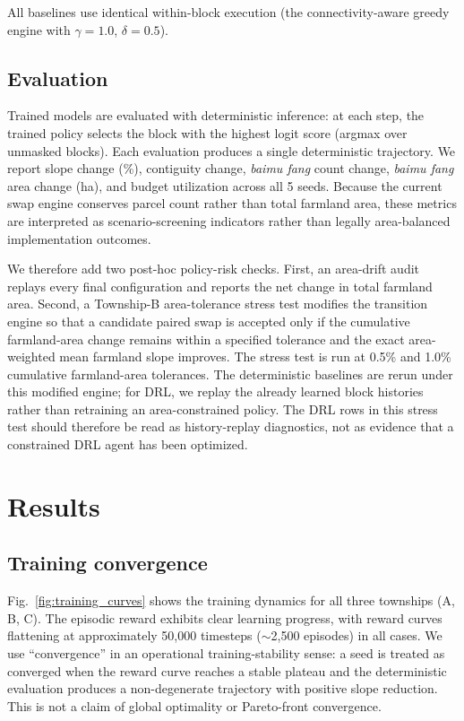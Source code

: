 \documentclass[preprint,12pt]{elsarticle}
\begin{document}
All baselines use identical within-block execution (the connectivity-aware greedy engine with $\gamma = 1.0$, $\delta = 0.5$).

\subsection{Evaluation}

Trained models are evaluated with deterministic inference: at each step, the trained policy selects the block with the highest logit score (argmax over unmasked blocks). Each evaluation produces a single deterministic trajectory. We report slope change (\%), contiguity change, \textit{baimu fang} count change, \textit{baimu fang} area change (ha), and budget utilization across all 5 seeds. Because the current swap engine conserves parcel count rather than total farmland area, these metrics are interpreted as scenario-screening indicators rather than legally area-balanced implementation outcomes.

We therefore add two post-hoc policy-risk checks. First, an area-drift audit replays every final configuration and reports the net change in total farmland area. Second, a Township-B area-tolerance stress test modifies the transition engine so that a candidate paired swap is accepted only if the cumulative farmland-area change remains within a specified tolerance and the exact area-weighted mean farmland slope improves. The stress test is run at 0.5\% and 1.0\% cumulative farmland-area tolerances. The deterministic baselines are rerun under this modified engine; for DRL, we replay the already learned block histories rather than retraining an area-constrained policy. The DRL rows in this stress test should therefore be read as history-replay diagnostics, not as evidence that a constrained DRL agent has been optimized.


\section{Results}
\label{sec:results}

\subsection{Training convergence}
\label{sec:convergence}

Fig.~\ref{fig:training_curves} shows the training dynamics for all three townships (A, B, C). The episodic reward exhibits clear learning progress, with reward curves flattening at approximately 50{,}000 timesteps ($\sim$2{,}500 episodes) in all cases. We use ``convergence'' in an operational training-stability sense: a seed is treated as converged when the reward curve reaches a stable plateau and the deterministic evaluation produces a non-degenerate trajectory with positive slope reduction. This is not a claim of global optimality or Pareto-front convergence.
\end{document}
